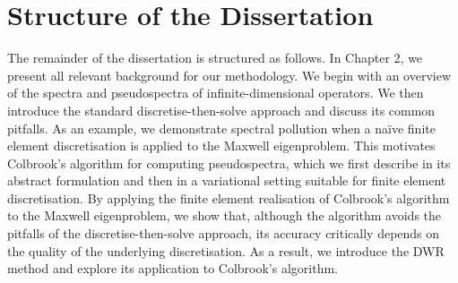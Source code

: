 



\section{Structure of the Dissertation}

The remainder of the dissertation is structured as follows. 
In Chapter 2, we present all relevant background for our methodology. We begin with an overview of the spectra and pseudospectra of infinite-dimensional operators. We then introduce the standard discretise-then-solve approach and discuss its common pitfalls. As an example, we demonstrate spectral pollution when a na\"ive finite element discretisation is applied to the Maxwell eigenproblem. This motivates Colbrook's algorithm for computing pseudospectra,
which we first describe in its abstract formulation and then in a variational setting suitable for finite element discretisation. By applying the finite element realisation of Colbrook's algorithm to the Maxwell eigenproblem,  we show that, although the algorithm avoids the pitfalls of the discretise-then-solve approach, its accuracy critically depends on the quality of the underlying discretisation. As a result, we introduce the DWR method 
and explore its application to Colbrook's algorithm. 

